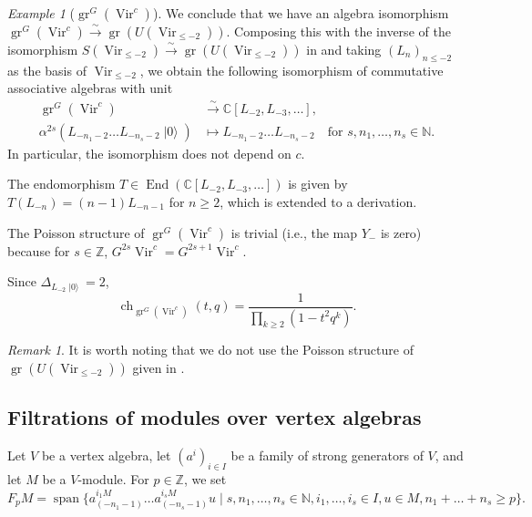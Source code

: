 \documentclass[a4paper, 12pt, reqno]{amsart}
\theoremstyle{remark}
\newtheorem{remark}[theorem]{Remark}
\newtheorem{example}[theorem]{Example}
\DeclareMathOperator{\Vir}{Vir}
\DeclareMathOperator{\gr}{gr}
\DeclareMathOperator{\End}{End}
\DeclareMathOperator{\ch}{ch}
\DeclareMathOperator{\vspan}{span}
\DeclareMathOperator{\vac}{|0\rangle}
\begin{document}
\begin{example}[$\gr^G(\Vir^c)$]
  We conclude that we have an algebra isomorphism $\gr^G(\Vir^c) \xrightarrow{\sim} \gr(U(\Vir_{\le -2}))$.
  Composing this with the inverse of the isomorphism $S(\Vir_{\le -2}) \xrightarrow{\sim} \gr(U(\Vir_{\le -2}))$ in  and taking $(L_n)_{n \le -2}$ as the basis of $\Vir_{\le -2}$, we obtain the following isomorphism of commutative associative algebras with unit
  \begin{align*}
    \gr^G(\Vir^c) &\xrightarrow{\sim} \mathbb{C}[L_{-2}, L_{-3}, \dots], \\
    \alpha^{2s}(L_{-n_1 - 2}\dots L_{-n_s - 2}\vac) &\mapsto L_{-n_1 - 2}\dots L_{-n_s - 2} \quad \text{for $s, n_1, \dots, n_s \in \mathbb{N}$}.
  \end{align*}
  In particular, the isomorphism does not depend on $c$.

  The endomorphism $T \in \End(\mathbb{C}[L_{-2}, L_{-3}, \dots])$ is given by $T(L_{-n}) = (n - 1)L_{-n - 1}$ for $n \ge 2$, which is extended to a derivation.

  The Poisson structure of $\gr^G(\Vir^c)$ is trivial (i.e., the map $Y_-$ is zero) because for $s \in \mathbb{Z}$, $G^{2s}\Vir^c = G^{2s + 1}\Vir^c$.

  Since $\Delta_{L_{-2}\vac} = 2$,
  \begin{equation*}
    \ch_{\gr^G(\Vir^c)}(t, q) = \frac{1}{\prod_{k \ge 2}(1 - t^2q^k)}.
  \end{equation*}
\end{example}

\begin{remark}
  \label{rmk:39}
  It is worth noting that we do not use the Poisson structure of $\gr(U(\Vir_{\le -2}))$ given in .
\end{remark}

\subsection{Filtrations of modules over vertex algebras}
\label{sec:filtr-modul-over}

Let $V$ be a vertex algebra, let $(a^i)_{i \in I}$ be a family of strong generators of $V$, and let $M$ be a $V$-module.
For $p \in \mathbb{Z}$, we set
\begin{equation*}
  F_pM = \vspan\{a^{i_1M}_{(-n_1 - 1)}\dots a^{i_sM}_{(-n_s - 1)}u \mid s, n_1, \dots, n_s \in \mathbb{N}, i_1, \dots, i_s \in I, u \in M, n_1 + \dots + n_s \ge p\}.
\end{equation*}
\end{document}

